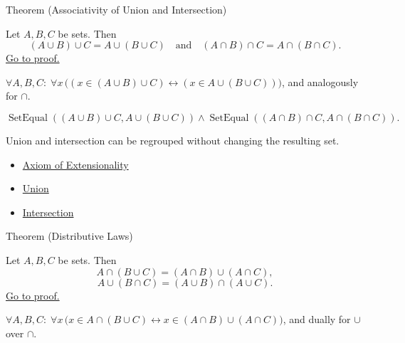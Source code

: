 \begin{theorembox}{Theorem (Associativity of Union and Intersection)}
\begin{theorem}\label{thm:associativity}
Let $A,B,C$ be sets. Then
\[
(A \cup B) \cup C = A \cup (B \cup C)
\quad\text{and}\quad
(A \cap B) \cap C = A \cap (B \cap C).
\]
\hyperref[prf:associativity]{Go to proof.}
\end{theorem}
\end{theorembox}

\begin{remark*}
$\forall A, B, C:\; \forall x\,\bigl((x \in (A \cup B) \cup C) \leftrightarrow (x \in A \cup (B \cup C))\bigr)$, and analogously for $\cap$.
\end{remark*}

\begin{remark*}
\[
  \operatorname{SetEqual}((A\cup B)\cup C,A\cup(B\cup C))
  \wedge
  \operatorname{SetEqual}((A\cap B)\cap C,A\cap(B\cap C)).
\]
\end{remark*}

\begin{remark*}[Interpretation]
Union and intersection can be regrouped without changing the resulting set.
\end{remark*}

\begin{dependencies}
\begin{itemize}
  \item \hyperref[ax:extensionality]{Axiom of Extensionality}
  \item \hyperref[def:union]{Union}
  \item \hyperref[def:intersection]{Intersection}
\end{itemize}
\end{dependencies}

\begin{theorembox}{Theorem (Distributive Laws)}
\begin{theorem}\label{thm:distributivity}
Let $A,B,C$ be sets. Then
\[
A \cap (B \cup C) = (A \cap B) \cup (A \cap C),
\]
\[
A \cup (B \cap C) = (A \cup B) \cap (A \cup C).
\]
\hyperref[prf:distributivity]{Go to proof.}
\end{theorem}
\end{theorembox}

\begin{remark*}
$\forall A, B, C:\; \forall x\,\bigl(x \in A \cap (B \cup C) \leftrightarrow x \in (A \cap B) \cup (A \cap C)\bigr)$, and dually for $\cup$ over $\cap$.
\end{remark*}

